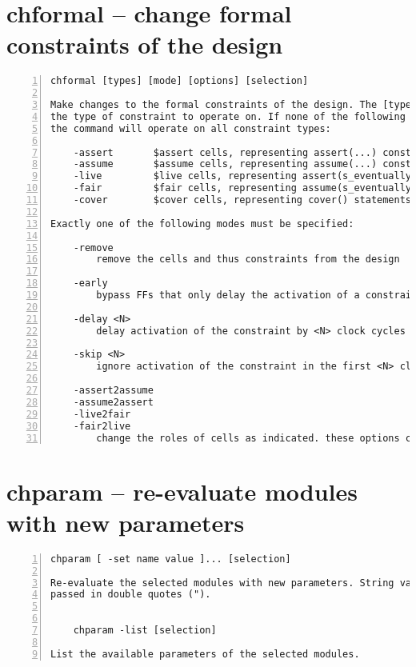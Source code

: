 \section{chformal -- change formal constraints of the design}
\label{cmd:chformal}
\begin{lstlisting}[numbers=left,frame=single]
    chformal [types] [mode] [options] [selection]

Make changes to the formal constraints of the design. The [types] options
the type of constraint to operate on. If none of the following options are given,
the command will operate on all constraint types:

    -assert       $assert cells, representing assert(...) constraints
    -assume       $assume cells, representing assume(...) constraints
    -live         $live cells, representing assert(s_eventually ...)
    -fair         $fair cells, representing assume(s_eventually ...)
    -cover        $cover cells, representing cover() statements

Exactly one of the following modes must be specified:

    -remove
        remove the cells and thus constraints from the design

    -early
        bypass FFs that only delay the activation of a constraint

    -delay <N>
        delay activation of the constraint by <N> clock cycles

    -skip <N>
        ignore activation of the constraint in the first <N> clock cycles

    -assert2assume
    -assume2assert
    -live2fair
    -fair2live
        change the roles of cells as indicated. these options can be combined
\end{lstlisting}

\section{chparam -- re-evaluate modules with new parameters}
\label{cmd:chparam}
\begin{lstlisting}[numbers=left,frame=single]
    chparam [ -set name value ]... [selection]

Re-evaluate the selected modules with new parameters. String values must be
passed in double quotes (").


    chparam -list [selection]

List the available parameters of the selected modules.
\end{lstlisting}

